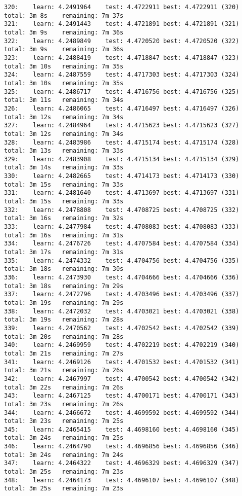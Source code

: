 \documentclass[11pt]{article}
\begin{document}
\begin{Verbatim}[commandchars=\\\{\}]
320:	learn: 4.2491964	test: 4.4722911	best: 4.4722911 (320)	total: 3m 8s	remaining: 7m 37s
321:	learn: 4.2491443	test: 4.4721891	best: 4.4721891 (321)	total: 3m 9s	remaining: 7m 36s
322:	learn: 4.2489849	test: 4.4720520	best: 4.4720520 (322)	total: 3m 9s	remaining: 7m 36s
323:	learn: 4.2488419	test: 4.4718847	best: 4.4718847 (323)	total: 3m 10s	remaining: 7m 35s
324:	learn: 4.2487559	test: 4.4717303	best: 4.4717303 (324)	total: 3m 10s	remaining: 7m 35s
325:	learn: 4.2486717	test: 4.4716756	best: 4.4716756 (325)	total: 3m 11s	remaining: 7m 34s
326:	learn: 4.2486065	test: 4.4716497	best: 4.4716497 (326)	total: 3m 12s	remaining: 7m 34s
327:	learn: 4.2484964	test: 4.4715623	best: 4.4715623 (327)	total: 3m 12s	remaining: 7m 34s
328:	learn: 4.2483986	test: 4.4715174	best: 4.4715174 (328)	total: 3m 13s	remaining: 7m 33s
329:	learn: 4.2483908	test: 4.4715134	best: 4.4715134 (329)	total: 3m 14s	remaining: 7m 33s
330:	learn: 4.2482665	test: 4.4714173	best: 4.4714173 (330)	total: 3m 15s	remaining: 7m 33s
331:	learn: 4.2481640	test: 4.4713697	best: 4.4713697 (331)	total: 3m 15s	remaining: 7m 33s
332:	learn: 4.2478808	test: 4.4708725	best: 4.4708725 (332)	total: 3m 16s	remaining: 7m 32s
333:	learn: 4.2477984	test: 4.4708083	best: 4.4708083 (333)	total: 3m 16s	remaining: 7m 31s
334:	learn: 4.2476726	test: 4.4707584	best: 4.4707584 (334)	total: 3m 17s	remaining: 7m 31s
335:	learn: 4.2474332	test: 4.4704756	best: 4.4704756 (335)	total: 3m 18s	remaining: 7m 30s
336:	learn: 4.2473930	test: 4.4704666	best: 4.4704666 (336)	total: 3m 18s	remaining: 7m 29s
337:	learn: 4.2472796	test: 4.4703496	best: 4.4703496 (337)	total: 3m 19s	remaining: 7m 29s
338:	learn: 4.2472032	test: 4.4703021	best: 4.4703021 (338)	total: 3m 19s	remaining: 7m 28s
339:	learn: 4.2470562	test: 4.4702542	best: 4.4702542 (339)	total: 3m 20s	remaining: 7m 28s
340:	learn: 4.2469959	test: 4.4702219	best: 4.4702219 (340)	total: 3m 21s	remaining: 7m 27s
341:	learn: 4.2469126	test: 4.4701532	best: 4.4701532 (341)	total: 3m 21s	remaining: 7m 26s
342:	learn: 4.2467997	test: 4.4700542	best: 4.4700542 (342)	total: 3m 22s	remaining: 7m 26s
343:	learn: 4.2467125	test: 4.4700171	best: 4.4700171 (343)	total: 3m 23s	remaining: 7m 26s
344:	learn: 4.2466672	test: 4.4699592	best: 4.4699592 (344)	total: 3m 23s	remaining: 7m 25s
345:	learn: 4.2465415	test: 4.4698160	best: 4.4698160 (345)	total: 3m 24s	remaining: 7m 25s
346:	learn: 4.2464790	test: 4.4696856	best: 4.4696856 (346)	total: 3m 24s	remaining: 7m 24s
347:	learn: 4.2464322	test: 4.4696329	best: 4.4696329 (347)	total: 3m 25s	remaining: 7m 23s
348:	learn: 4.2464173	test: 4.4696107	best: 4.4696107 (348)	total: 3m 25s	remaining: 7m 23s

\end{Verbatim}
\end{document}
